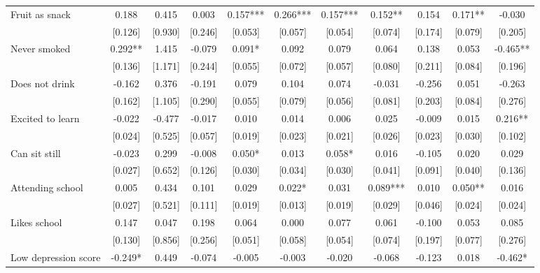 \documentclass[12pt]{article}
\begin{document}
\begin{table}[ht]
\begin{center}
\begin{adjustbox}{width=1.2\textwidth,center=\textwidth}
\begin{tabular}{l*{10}{c}}
Fruit as snack & 0.188 & 0.415 & 0.003 & 0.157*** & 0.266*** & 0.157*** & 0.152** & 0.154 & 0.171** & -0.030 \\
 & [0.126] & [0.930] & [0.246] & [0.053] & [0.057] & [0.054] & [0.074] & [0.174] & [0.079] & [0.205] \\
Never smoked & 0.292** & 1.415 & -0.079 & 0.091* & 0.092 & 0.079 & 0.064 & 0.138 & 0.053 & -0.465** \\
 & [0.136] & [1.171] & [0.244] & [0.055] & [0.072] & [0.057] & [0.080] & [0.211] & [0.084] & [0.196] \\
Does not drink & -0.162 & 0.376 & -0.191 & 0.079 & 0.104 & 0.074 & -0.031 & -0.256 & 0.051 & -0.263 \\
 & [0.162] & [1.105] & [0.290] & [0.055] & [0.079] & [0.056] & [0.081] & [0.203] & [0.084] & [0.276] \\
Excited to learn & -0.022 & -0.477 & -0.017 & 0.010 & 0.014 & 0.006 & 0.025 & -0.009 & 0.015 & 0.216** \\
 & [0.024] & [0.525] & [0.057] & [0.019] & [0.023] & [0.021] & [0.026] & [0.023] & [0.030] & [0.102] \\
Can sit still & -0.023 & 0.299 & -0.008 & 0.050* & 0.013 & 0.058* & 0.016 & -0.105 & 0.020 & 0.029 \\
 & [0.027] & [0.652] & [0.126] & [0.030] & [0.034] & [0.030] & [0.041] & [0.091] & [0.040] & [0.136] \\
Attending school & 0.005 & 0.434 & 0.101 & 0.029 & 0.022* & 0.031 & 0.089*** & 0.010 & 0.050** & 0.016 \\
 & [0.027] & [0.521] & [0.111] & [0.019] & [0.013] & [0.019] & [0.029] & [0.046] & [0.024] & [0.024] \\
Likes school & 0.147 & 0.047 & 0.198 & 0.064 & 0.000 & 0.077 & 0.061 & -0.100 & 0.053 & 0.085 \\
 & [0.130] & [0.856] & [0.256] & [0.051] & [0.058] & [0.054] & [0.074] & [0.197] & [0.077] & [0.276] \\
Low depression score & -0.249* & 0.449 & -0.074 & -0.005 & -0.003 & -0.020 & -0.068 & -0.123 & 0.018 & -0.462* \\

\end{tabular}
\end{adjustbox}
\end{center}
\end{table}
\end{document}
